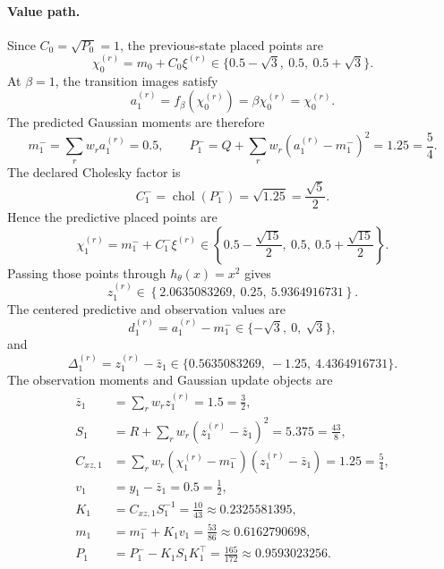 \documentclass[11pt]{article}
\numberwithin{equation}{section}
\newcommand{\chol}{\operatorname{chol}}
\begin{document}
\paragraph{Value path.}
Since \(C_0=\sqrt{P_0}=1\), the previous-state placed points are
\begin{equation}
  \chi_0^{(r)}=m_0+C_0\xi^{(r)}
  \in
  \{0.5-\sqrt3,\ 0.5,\ 0.5+\sqrt3\}.
  \label{eq:p32-example-prev-points}
\end{equation}
At \(\beta=1\), the transition images satisfy
\begin{equation}
  a_1^{(r)}=f_\beta(\chi_0^{(r)})=\beta\chi_0^{(r)}=\chi_0^{(r)}.
  \label{eq:p32-example-transition-images}
\end{equation}
The predicted Gaussian moments are therefore
\begin{equation}
  m_1^-=
  \sum_rw_ra_1^{(r)}=0.5,
  \qquad
  P_1^-=Q+\sum_rw_r(a_1^{(r)}-m_1^-)^2=1.25=\frac54.
  \label{eq:p32-example-pred-moments}
\end{equation}
The declared Cholesky factor is
\begin{equation}
  C_1^-=\chol(P_1^-)=\sqrt{1.25}=\frac{\sqrt5}{2}.
  \label{eq:p32-example-pred-factor}
\end{equation}
Hence the predictive placed points are
\begin{equation}
  \chi_1^{(r)}=m_1^-+C_1^-\xi^{(r)}
  \in
  \left\{0.5-\frac{\sqrt{15}}{2},\ 0.5,\ 0.5+\frac{\sqrt{15}}{2}\right\}.
  \label{eq:p32-example-pred-points}
\end{equation}
Passing those points through \(h_\theta(x)=x^2\) gives
\begin{equation}
  z_1^{(r)}
  \in
  \left\{2.0635083269,\ 0.25,\ 5.9364916731\right\}.
  \label{eq:p32-example-z-values}
\end{equation}
The centered predictive and observation values are
\begin{equation}
  d_1^{(r)}=a_1^{(r)}-m_1^-
  \in
  \{-\sqrt3,\ 0,\ \sqrt3\},
  \label{eq:p32-example-d}
\end{equation}
and
\begin{equation}
  \Delta_1^{(r)}=z_1^{(r)}-\bar z_1
  \in
  \{0.5635083269,\ -1.25,\ 4.4364916731\}.
  \label{eq:p32-example-Delta}
\end{equation}
The observation moments and Gaussian update objects are
\begin{align}
  \bar z_1&=\sum_rw_r z_1^{(r)}=1.5=\frac32,
  \label{eq:p32-example-zbar}\\
  S_1&=R+\sum_rw_r(z_1^{(r)}-\bar z_1)^2=5.375=\frac{43}{8},
  \label{eq:p32-example-S}\\
  C_{xz,1}&=\sum_rw_r(\chi_1^{(r)}-m_1^-)(z_1^{(r)}-\bar z_1)=1.25=\frac54,
  \label{eq:p32-example-Cxz}\\
  v_1&=y_1-\bar z_1=0.5=\frac12,
  \label{eq:p32-example-v}\\
  K_1&=C_{xz,1}S_1^{-1}=\frac{10}{43}\approx0.2325581395,
  \label{eq:p32-example-K}\\
  m_1&=m_1^-+K_1v_1=\frac{53}{86}\approx0.6162790698,
  \label{eq:p32-example-m}\\
  P_1&=P_1^- -K_1S_1K_1^\top=\frac{165}{172}\approx0.9593023256.
  \label{eq:p32-example-P}
\end{align}
\end{document}
